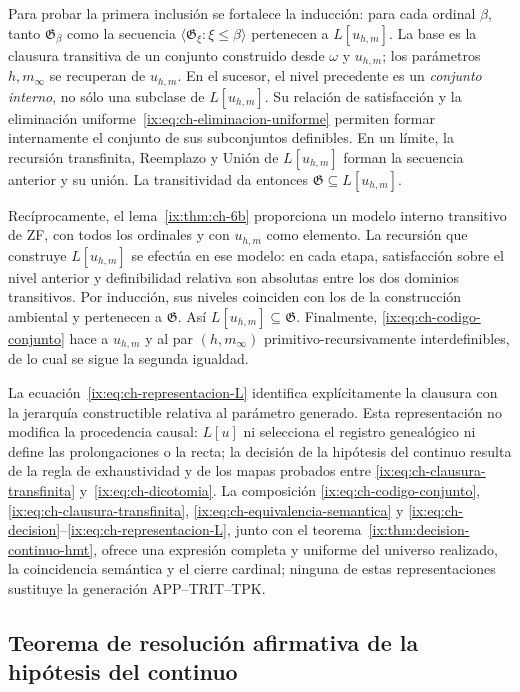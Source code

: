 Para probar la primera inclusión se fortalece la inducción: para cada
ordinal \(\beta\), tanto \(\mathfrak G_\beta\) como la secuencia
\(\langle\mathfrak G_\xi:\xi\leq\beta\rangle\) pertenecen a
\(L[u_{h,m}]\). La base es la clausura transitiva de un conjunto construido
desde \(\omega\) y \(u_{h,m}\); los parámetros \(h,m_\infty\) se recuperan
de \(u_{h,m}\). En el sucesor, el nivel precedente es un \emph{conjunto
interno}, no sólo una subclase de \(L[u_{h,m}]\). Su relación de satisfacción
y la eliminación uniforme~\eqref{ix:eq:ch-eliminacion-uniforme} permiten formar internamente el conjunto de
sus subconjuntos definibles. En un límite, la recursión transfinita,
Reemplazo y Unión de \(L[u_{h,m}]\) forman la secuencia anterior y su unión.
La transitividad da entonces \(\mathfrak G\subseteq L[u_{h,m}]\).

Recíprocamente, el lema~\ref{ix:thm:ch-6b} proporciona un modelo interno
transitivo de ZF, con todos los ordinales y con \(u_{h,m}\) como elemento.
La recursión que construye \(L[u_{h,m}]\) se efectúa en ese modelo: en cada
etapa, satisfacción sobre el nivel anterior y definibilidad relativa son
absolutas entre los dos dominios transitivos. Por inducción, sus niveles
coinciden con los de la construcción ambiental y pertenecen a
\(\mathfrak G\). Así \(L[u_{h,m}]\subseteq\mathfrak G\). Finalmente,
\eqref{ix:eq:ch-codigo-conjunto} hace a \(u_{h,m}\) y al par \((h,m_\infty)\)
primitivo-recursivamente interdefinibles, de lo cual se sigue la segunda
igualdad.

La ecuación~\eqref{ix:eq:ch-representacion-L} identifica explícitamente la
clausura con la jerarquía constructible relativa al parámetro generado. Esta
representación no modifica la procedencia causal: \(L[u]\) ni selecciona el
registro genealógico ni define las prolongaciones o la recta; la decisión de
la hipótesis del continuo resulta de la regla de exhaustividad y de los mapas probados entre
\eqref{ix:eq:ch-clausura-transfinita} y~\eqref{ix:eq:ch-dicotomia}. La composición
\eqref{ix:eq:ch-codigo-conjunto}, \eqref{ix:eq:ch-clausura-transfinita},
\eqref{ix:eq:ch-equivalencia-semantica} y
\eqref{ix:eq:ch-decision}--\eqref{ix:eq:ch-representacion-L}, junto con el
teorema~\ref{ix:thm:decision-continuo-hmt}, ofrece una expresión completa y
uniforme del universo realizado, la coincidencia semántica y el cierre
cardinal; ninguna de estas representaciones sustituye la generación
APP--TRIT--TPK.

\subsection{Teorema de resolución afirmativa de la hipótesis del continuo}


